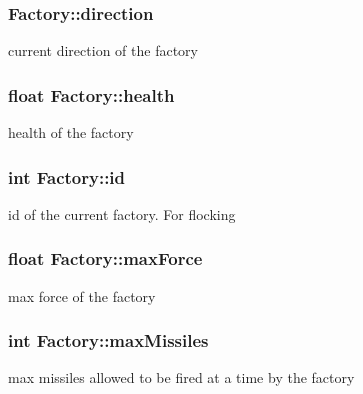 \subsubsection[{\texorpdfstring{direction}{direction}}]{ Factory\+::direction\hspace{0.3cm}{\ttfamily [private]}}\hypertarget{class_factory_a637041324e7a78cd1b099d8b5297e3f1}{}\label{class_factory_a637041324e7a78cd1b099d8b5297e3f1}
current direction of the factory 
\subsubsection[{\texorpdfstring{health}{health}}]{\setlength{\rightskip}{0pt plus 5cm}float Factory\+::health\hspace{0.3cm}{\ttfamily [private]}}\hypertarget{class_factory_a8f0438d0c9a26df91ddd51bcf5fab055}{}\label{class_factory_a8f0438d0c9a26df91ddd51bcf5fab055}
health of the factory 
\subsubsection[{\texorpdfstring{id}{id}}]{\setlength{\rightskip}{0pt plus 5cm}int Factory\+::id\hspace{0.3cm}{\ttfamily [private]}}\hypertarget{class_factory_ae4674e47d76d1ee285c6f756f78717b3}{}\label{class_factory_ae4674e47d76d1ee285c6f756f78717b3}
id of the current factory. For flocking 
\subsubsection[{\texorpdfstring{max\+Force}{maxForce}}]{\setlength{\rightskip}{0pt plus 5cm}float Factory\+::max\+Force\hspace{0.3cm}{\ttfamily [private]}}\hypertarget{class_factory_ae3dd0fca70d57ab4919052d3c4728285}{}\label{class_factory_ae3dd0fca70d57ab4919052d3c4728285}
max force of the factory 
\subsubsection[{\texorpdfstring{max\+Missiles}{maxMissiles}}]{\setlength{\rightskip}{0pt plus 5cm}int Factory\+::max\+Missiles\hspace{0.3cm}{\ttfamily [private]}}\hypertarget{class_factory_a025dc63826c2a6d99eb9c2497d8b2e9c}{}\label{class_factory_a025dc63826c2a6d99eb9c2497d8b2e9c}
max missiles allowed to be fired at a time by the factory 
